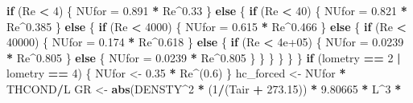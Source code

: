 \documentclass[]{article}
\newenvironment{Shaded}{\begin{snugshade}}{\end{snugshade}}
\newcommand{\KeywordTok}[1]{\textcolor[rgb]{0.13,0.29,0.53}{\textbf{#1}}}
\newcommand{\DecValTok}[1]{\textcolor[rgb]{0.00,0.00,0.81}{#1}}
\newcommand{\FloatTok}[1]{\textcolor[rgb]{0.00,0.00,0.81}{#1}}
\newcommand{\StringTok}[1]{\textcolor[rgb]{0.31,0.60,0.02}{#1}}
\newcommand{\ControlFlowTok}[1]{\textcolor[rgb]{0.13,0.29,0.53}{\textbf{#1}}}
\newcommand{\OperatorTok}[1]{\textcolor[rgb]{0.81,0.36,0.00}{\textbf{#1}}}
\newcommand{\NormalTok}[1]{#1}
\begin{document}
\begin{Shaded}
\begin{Highlighting}[]
        \ControlFlowTok{if}\NormalTok{ (Re }\OperatorTok{<}\StringTok{ }\DecValTok{4}\NormalTok{) \{}
\NormalTok{            NUfor =}\StringTok{ }\FloatTok{0.891} \OperatorTok{*}\StringTok{ }\NormalTok{Re}\OperatorTok{^}\FloatTok{0.33}
\NormalTok{        \}}
        \ControlFlowTok{else}\NormalTok{ \{}
            \ControlFlowTok{if}\NormalTok{ (Re }\OperatorTok{<}\StringTok{ }\DecValTok{40}\NormalTok{) \{}
\NormalTok{                NUfor =}\StringTok{ }\FloatTok{0.821} \OperatorTok{*}\StringTok{ }\NormalTok{Re}\OperatorTok{^}\FloatTok{0.385}
\NormalTok{            \}}
            \ControlFlowTok{else}\NormalTok{ \{}
                \ControlFlowTok{if}\NormalTok{ (Re }\OperatorTok{<}\StringTok{ }\DecValTok{4000}\NormalTok{) \{}
\NormalTok{                  NUfor =}\StringTok{ }\FloatTok{0.615} \OperatorTok{*}\StringTok{ }\NormalTok{Re}\OperatorTok{^}\FloatTok{0.466}
\NormalTok{                \}}
                \ControlFlowTok{else}\NormalTok{ \{}
                  \ControlFlowTok{if}\NormalTok{ (Re }\OperatorTok{<}\StringTok{ }\DecValTok{40000}\NormalTok{) \{}
\NormalTok{                    NUfor =}\StringTok{ }\FloatTok{0.174} \OperatorTok{*}\StringTok{ }\NormalTok{Re}\OperatorTok{^}\FloatTok{0.618}
\NormalTok{                  \}}
                  \ControlFlowTok{else}\NormalTok{ \{}
                    \ControlFlowTok{if}\NormalTok{ (Re }\OperatorTok{<}\StringTok{ }\FloatTok{4e+05}\NormalTok{) \{}
\NormalTok{                      NUfor =}\StringTok{ }\FloatTok{0.0239} \OperatorTok{*}\StringTok{ }\NormalTok{Re}\OperatorTok{^}\FloatTok{0.805}
\NormalTok{                    \}}
                    \ControlFlowTok{else}\NormalTok{ \{}
\NormalTok{                      NUfor =}\StringTok{ }\FloatTok{0.0239} \OperatorTok{*}\StringTok{ }\NormalTok{Re}\OperatorTok{^}\FloatTok{0.805}
\NormalTok{                    \}}
\NormalTok{                  \}}
\NormalTok{                \}}
\NormalTok{            \}}
\NormalTok{        \}}
\NormalTok{    \}}
    \ControlFlowTok{if}\NormalTok{ (lometry }\OperatorTok{==}\StringTok{ }\DecValTok{2} \OperatorTok{|}\StringTok{ }\NormalTok{lometry }\OperatorTok{==}\StringTok{ }\DecValTok{4}\NormalTok{) \{}
\NormalTok{        NUfor <-}\StringTok{ }\FloatTok{0.35} \OperatorTok{*}\StringTok{ }\NormalTok{Re}\OperatorTok{^}\NormalTok{(}\FloatTok{0.6}\NormalTok{)}
\NormalTok{    \}}
\NormalTok{    hc_forced <-}\StringTok{ }\NormalTok{NUfor }\OperatorTok{*}\StringTok{ }\NormalTok{THCOND}\OperatorTok{/}\NormalTok{L}
\NormalTok{    GR <-}\StringTok{ }\KeywordTok{abs}\NormalTok{(DENSTY}\OperatorTok{^}\DecValTok{2} \OperatorTok{*}\StringTok{ }\NormalTok{(}\DecValTok{1}\OperatorTok{/}\NormalTok{(Tair }\OperatorTok{+}\StringTok{ }\FloatTok{273.15}\NormalTok{)) }\OperatorTok{*}\StringTok{ }\FloatTok{9.80665} \OperatorTok{*}\StringTok{ }\NormalTok{L}\OperatorTok{^}\DecValTok{3} \OperatorTok{*}\StringTok{ }

\end{Highlighting}
\end{Shaded}
\end{document}
